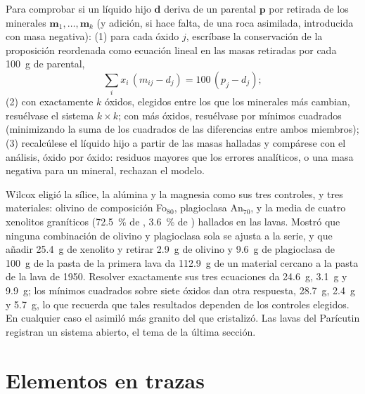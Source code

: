\begin{method}\label{met:b2:magmatic-differentiation:massbalance}
Para comprobar si un líquido hijo $\mathbf d$ deriva de un  parental $\mathbf p$ por
retirada de los minerales $\mathbf m_1, \dots, \mathbf m_k$ (y adición, si hace falta, de una
roca asimilada, introducida con masa negativa): (1) para cada óxido $j$, escríbase la
conservación de la proposición reordenada como ecuación lineal en las masas
retiradas por cada \qty{100}{g} de  parental,
\[
\sum_i x_i\,(m_{ij} - d_j) = 100\,(p_j - d_j);
\]
(2) con exactamente $k$ óxidos, elegidos entre los que los minerales más cambian, resuélvase el
sistema $k \times k$; con más óxidos, resuélvase por mínimos cuadrados (minimizando la suma
de los cuadrados de las diferencias entre ambos miembros); (3) recalcúlese el líquido hijo a partir de
las masas halladas y compárese con el análisis, óxido por óxido: residuos mayores
que los errores analíticos, o una masa negativa para un mineral, rechazan el modelo.
\end{method}

Wilcox eligió la sílice, la alúmina y la magnesia como sus tres controles, y tres
materiales: olivino de composición Fo$_{80}$, plagioclasa An$_{70}$, y la media
de cuatro xenolitos graníticos (\qty{72.5}{\percent} de , \qty{3.6}{\percent} de
) hallados en las lavas. Mostró que ninguna combinación de olivino y
plagioclasa sola se ajusta a la serie, y que añadir \qty{25.4}{g} de xenolito y
retirar \qty{2.9}{g} de olivino y \qty{9.6}{g} de plagioclasa de
\qty{100}{g} de la pasta de la primera lava da \qty{112.9}{g} de un material
cercano a la pasta de la lava de 1950. Resolver exactamente sus tres ecuaciones
da \qty{24.6}{g}, \qty{3.1}{g} y \qty{9.9}{g}; los mínimos cuadrados sobre siete óxidos
dan otra respuesta, \qty{28.7}{g}, \qty{2.4}{g} y \qty{5.7}{g}, lo que recuerda
que tales resultados dependen de los controles elegidos. En cualquier caso el  asimiló más
granito del que cristalizó. Las lavas del Parícutin registran un sistema abierto, el
tema de la última sección.

\section{Elementos en trazas}\label{sec:b2:magmatic-differentiation:trace}

